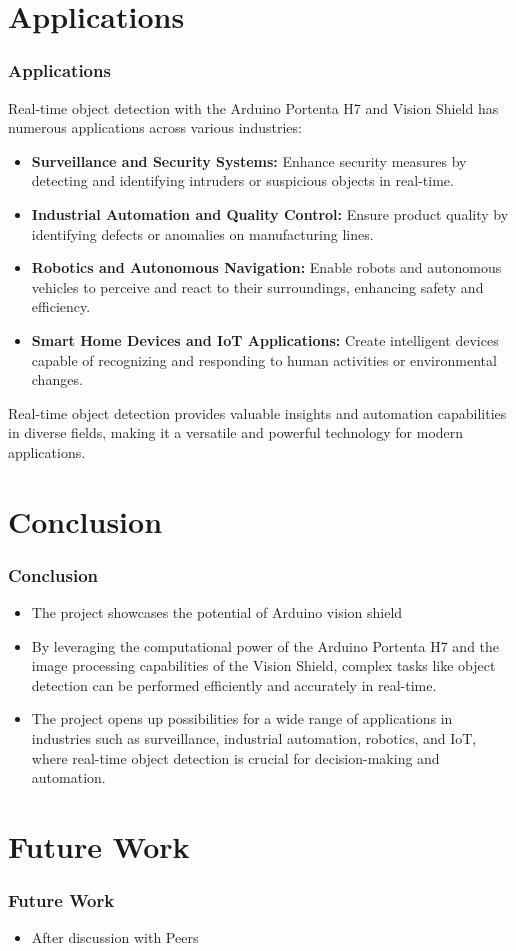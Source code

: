 \documentclass[10pt, a4paper]{beamer}
\begin{document}
	\section{Applications}
	\begin{frame}
		\frametitle{Applications}
		
		Real-time object detection with the Arduino Portenta H7 and Vision Shield has numerous applications across various industries:
		
		\begin{itemize}
			\item \textbf{Surveillance and Security Systems:} Enhance security measures by detecting and identifying intruders or suspicious objects in real-time.
			\item \textbf{Industrial Automation and Quality Control:} Ensure product quality by identifying defects or anomalies on manufacturing lines.
			\item \textbf{Robotics and Autonomous Navigation:} Enable robots and autonomous vehicles to perceive and react to their surroundings, enhancing safety and efficiency.
			\item \textbf{Smart Home Devices and IoT Applications:} Create intelligent devices capable of recognizing and responding to human activities or environmental changes.
		\end{itemize}
		
		Real-time object detection provides valuable insights and automation capabilities in diverse fields, making it a versatile and powerful technology for modern applications.
		
	\end{frame}
	
	
	\section{Conclusion}
	\begin{frame}
		\frametitle{Conclusion}
		
		
		\begin{itemize}
			\item The project showcases the potential of Arduino vision shield
			\item By leveraging the computational power of the Arduino Portenta H7 and the image processing capabilities of the Vision Shield, complex tasks like object detection can be performed efficiently and accurately in real-time.
			\item The project opens up possibilities for a wide range of applications in industries such as surveillance, industrial automation, robotics, and IoT, where real-time object detection is crucial for decision-making and automation.
		\end{itemize}
		
	\end{frame}
	
	\section{Future Work}
	\begin{frame}
		\frametitle{Future Work}
		\begin{itemize}
			\item After discussion with Peers
		\end{itemize}
	\end{frame}
	
	
	
\end{document}
